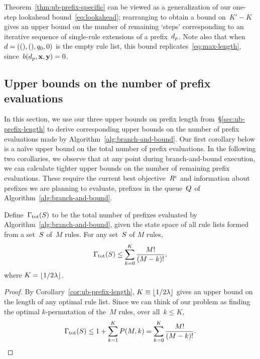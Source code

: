 Theorem~\ref{thm:ub-prefix-specific} can be viewed as a generalization
of our one-step lookahead bound~\eqref{eq:lookahead};
rearranging to obtain a bound on~${K' - K}$
gives an upper bound on the number of remaining `steps' corresponding
to an iterative sequence of single-rule extensions of a prefix~$d_p$.
%
Note also that when~${{d} = ((), (), q_0, 0)}$ is the empty rule list,
this bound replicates~\eqref{eq:max-length}, since~${b(d_p, \mathbf{x}, \mathbf{y}) = 0}$.

\subsection{Upper bounds on the number of prefix evaluations}
\label{sec:ub-size}

In this section, we use our three upper bounds on prefix length
from~\S\ref{sec:ub-prefix-length} to derive corresponding
upper bounds on the number of prefix evaluations made by
Algorithm~\ref{alg:branch-and-bound}.
%
Our first corollary below is a na\"ive upper bound on
the total number of prefix evaluations.
%
In the following two corollaries, we observe that at any point during
branch-and-bound execution, we can calculate tighter upper bounds
on the number of remaining prefix evaluations.
%
These require the current best objective~${R^c}$
and information about prefixes we are planning to evaluate,
\ie prefixes in the queue~$Q$ of Algorithm~\ref{alg:branch-and-bound}.

\begin{corollary}
\label{thm:ub-total-eval}
%
Define~${\Gamma_{\textnormal{tot}}}(S)$ to be the total number of prefixes
evaluated by Algorithm~\ref{alg:branch-and-bound}, given the state space of
all rule lists formed from a set~$S$ of~$M$ rules.
%
For any set~$S$ of $M$ rules,
\begin{align}
\TotalRemaining(\RuleSet) \le \sum_{k=0}^K \frac{M!}{(M - k)!},
\label{eq:size-naive}
\end{align}
where ${K = \lfloor 1/2 {\lambda} \rfloor}$.
\end{corollary}

\begin{proof}
By Corollary~\ref{cor:ub-prefix-length},
${K \equiv \lfloor 1 / 2 {\lambda} \rfloor}$
gives an upper bound on the length of any optimal rule list.
%
Since we can think of our problem as finding the optimal
$k$-permutation of the~$M$ rules, over all~${k \le K}$,
\begin{align}
\TotalRemaining(\RuleSet) \le 1 + \sum_{k=1}^K P(M, k)
= \sum_{k=0}^K \frac{M!}{(M - k)!}.
\end{align}
\end{proof}

